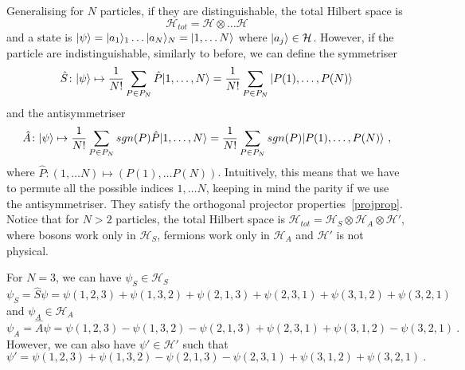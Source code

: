     Generalising for $N$ particles, if they are distinguishable, the total Hilbert space is 
    \begin{equation*}
        \mathcal H_{tot} = \mathcal H \otimes \ldots \mathcal H
    \end{equation*}
    and a state is $\vert\psi\rangle = \vert a_1\rangle_1 \ldots \vert a_N\rangle_N = \vert1, \ldots N\rangle$ where $\vert a_j\rangle \in \mathcal H$. 
    However, if the particle are indistinguishable, similarly to before, we can define the symmetriser
    \begin{equation*}
        \hat S \colon \vert\psi\rangle \mapsto \frac{1}{N!} \sum_{P \in P_N} \hat P \vert1, \ldots, N\rangle = \frac{1}{N!} \sum_{P \in P_N} \vert P(1), \ldots, P(N)\rangle
    \end{equation*}
    and the antisymmetriser
    \begin{equation*}
        \hat A \colon \vert\psi\rangle \mapsto \frac{1}{N!} \sum_{P \in P_N} sgn(P) \hat P \vert1, \ldots, N\rangle = \frac{1}{N!} \sum_{P \in P_N} sgn(P) \vert P(1), \ldots, P(N)\rangle ~,
    \end{equation*}
    where $\hat P: (1, \ldots N) \mapsto (P(1), \ldots P(N))$. Intuitively, this means that we have to permute all the possible indices $1, \ldots N$, keeping in mind the parity if we use the antisymmetriser. They satisfy the orthogonal projector properties~\eqref{projprop}. Notice that for $N > 2$ particles, the total Hilbert space is $\mathcal H_{tot} = \mathcal H_S \otimes \mathcal H_A \otimes \mathcal H'$, where bosons work only in $\mathcal H_S$, fermions work only in $\mathcal H_A$ and $\mathcal H'$ is not physical.

    \begin{example}
        For $N=3$, we can have $\psi_S \in \mathcal H_S$
        \begin{equation*}
            \psi_S = \hat S \psi = \psi(1,2,3) + \psi(1,3,2) + \psi(2,1,3) + \psi(2,3,1) + \psi(3,1,2) + \psi(3,2,1)
        \end{equation*}
        and $\psi_A \in \mathcal H_A$
        \begin{equation*}
            \psi_A = \hat A \psi = \psi(1,2,3) - \psi(1,3,2) - \psi(2,1,3) + \psi(2,3,1) + \psi(3,1,2) - \psi(3,2,1) ~.
        \end{equation*}
        However, we can also have $\psi' \in \mathcal H'$ such that
        \begin{equation*}
            \psi' = \psi(1,2,3) + \psi(1,3,2) -  \psi(2,1,3) - \psi(2,3,1) + \psi(3,1,2) + \psi(3,2,1) ~.
        \end{equation*}
    \end{example}
    
